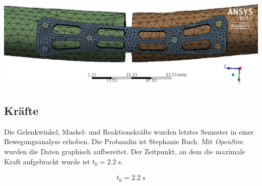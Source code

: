 		\begin{Figure}
			\centering
			\includegraphics[width=15cm]{content/images/mesh_quality_graph_3.png}
			\label{fig:device3}
		\end{Figure}

	\subsection{Kräfte}
	
		Die Gelenkwinkel, Muskel- und Reaktionskräfte wurden letztes Semester in einer
		Bewegungsanalyse erhoben. Die Probandin ist Stephanie Ruch. Mit \textit{OpenSim} wurden
		die Daten graphisch aufbereitet. Der Zeitpunkt, an dem die maximale Kraft aufgebracht
		wurde ist $ t_0 = \SI{2.2}{s} $.
		
		\begin{mycapequ}[!ht]
			\vspace{-5mm}
			\begin{align*}
				t_0 = \SI{2.2}{s}
			\end{align*}
			\vspace{-8mm}
		\end{mycapequ}
	
